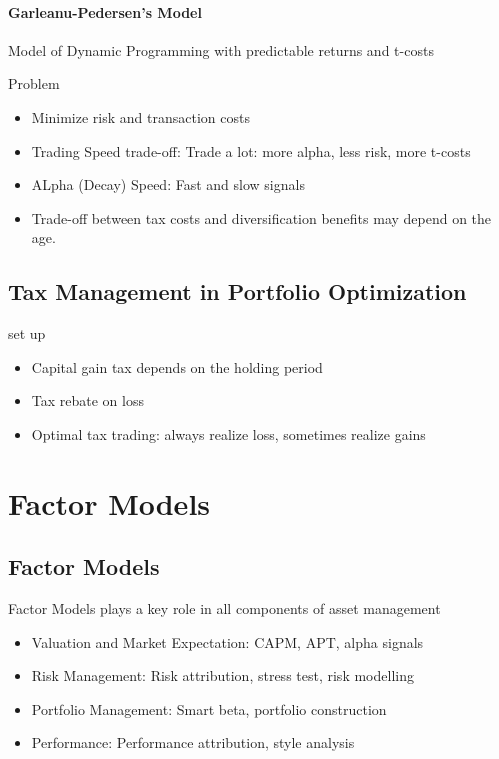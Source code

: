 \documentclass[11pt, openany]{book}              %
\begin{document}
\subsubsection{Garleanu-Pedersen's Model}

Model of Dynamic Programming with predictable returns and t-costs

Problem
\begin{itemize}
	\item Minimize risk and transaction costs
	\item Trading Speed trade-off: Trade a lot: more alpha, less risk, more t-costs 
	\item ALpha (Decay) Speed: Fast and slow signals
	\item Trade-off between tax costs and diversification benefits may depend on the age.
\end{itemize}

\section{Tax Management in Portfolio Optimization}

set up

\begin{itemize}
	\item Capital gain tax depends on the holding period
	\item Tax rebate on loss
	\item Optimal tax trading: always realize loss, sometimes realize gains
\end{itemize}

\chapter{Factor Models}

\section{Factor Models}

Factor Models plays a key role in all components of asset management

\begin{itemize}
	\item Valuation and Market Expectation: CAPM, APT, alpha signals
	\item Risk Management: Risk attribution, stress test, risk modelling
	\item Portfolio Management: Smart beta, portfolio construction
	\item Performance: Performance attribution, style analysis
\end{itemize}
\end{document}
